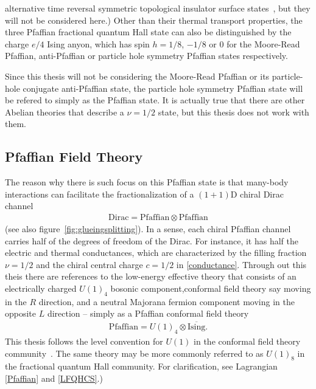 alternative time reversal symmetric topological insulator surface states~\cite{WangPotterSenthilgapTI13,MetlitskiKaneFisher13b,BondersonNayakQi13}, but they will not be considered here.) Other than their thermal transport properties, the three Pfaffian fractional quantum Hall state can also be distinguished by the charge $e/4$ Ising anyon, which has spin $h=1/8$, $-1/8$ or $0$ for the Moore-Read Pfaffian, anti-Pfaffian or particle hole symmetry Pfaffian states respectively. 

Since this thesis will not be considering the Moore-Read Pfaffian or its particle-hole conjugate anti-Pfaffian state, the particle hole symmetry Pfaffian state will be refered to simply as the Pfaffian state. It is actually true that there are other Abelian theories that describe a $\nu=1/2$ state, but this thesis does not work with them.

\subsection{Pfaffian Field Theory}
The reason why there is such focus on this Pfaffian state is that many-body interactions can facilitate the fractionalization of a $(1+1)$D chiral Dirac channel \begin{align}\mathrm{Dirac}=\mathrm{Pfaffian}\otimes\mathrm{Pfaffian}\label{fractionalization}\end{align} (see also figure~\ref{fig:glueingsplitting}). In a sense, each chiral Pfaffian channel carries half of the degrees of freedom of the Dirac. For instance, it has half the electric and thermal conductances, which are characterized by the filling fraction $\nu=1/2$ and the chiral central charge $c=1/2$ in \eqref{conductance}. Through out this theis there are references to the low-energy effective theory that consists of an electrically charged $U(1)_4$ bosonic component,conformal field theory say moving in the $R$ direction, and a neutral Majorana fermion component moving in the opposite $L$ direction -- simply as a Pfaffian conformal field theory \begin{align}\mathrm{Pfaffian}=U(1)_4\otimes\overline{\mathrm{Ising}}.\label{PfaffianCFT}\end{align} This thesis follows the level convention for $U(1)$ in the conformal field theory community~\cite{bigyellowbook}. The same theory may be more commonly referred to as $U(1)_8$ in the fractional quantum Hall community. For clarification, see Lagrangian \eqref{Pfaffian} and \eqref{LFQHCS}.)


